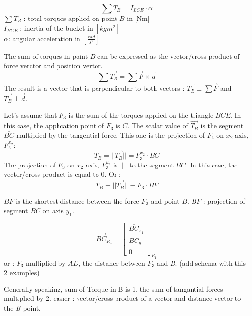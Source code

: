 \documentclass[12pt,a4paper]{article}
\begin{document}
	
		 
	\newpage
	\begin{equation}
		\sum T_B = I_{BCE} \cdot \alpha
	\end{equation}
	$\sum T_B$ : total torques applied on point $B$ in [Nm]\\
	$I_{BCE}$ : inertia of the bucket in $[kg m^2]$\\
	$\alpha$: angular acceleration in $[\frac{rad}{s^2}] $
	
	The sum of torques in point $B$ can be expressed as the vector/cross product of force verctor and position vertor. 
	\begin{equation}
		\sum \vec{T_B} = \sum \vec{F} \times \vec{d}
	\end{equation}
	The result is a vector that is perpendicular to both vectors : 
	$\vec{T_B} \perp \sum \vec{F}$ and 
	$\vec{T_B} \perp \vec{d}$.
	
	Let's assume that $F_3$ is the sum of the torques applied on the triangle $BCE$. In this case, the application point of $F_3$ is $C$. The scalar value of $\vec{T_B}$ is  the segment $\overline{BC}$ multiplied by the tangential force. This one is the projection of $F_3$ on $x_2$ axis, $F_3^{x_2}$:
	\begin{equation}
		T_B=||\vec{T_B}|| = F_3^{x_2} \cdot \overline{BC}
	\end{equation}
	The projection of $F_3$ on $x_2$ axis, $F_3^{y_2}$ is $\parallel$ to the segment $BC$. In this case, the vector/cross product is equal to $0$.
	Or : 
	\begin{equation}
		T_B=||\vec{T_B}|| = F_3 \cdot \overline{BF}
	\end{equation}
	
	$\overline{B F}$ is the shortest distance between the force $F_3$ and point $B$.
	$\overline{B F}$ : projection of segment $\overline{BC}$ on axis $y_1$. 
	
	\begin{equation}
		\vec{BC}_{R_{1}}=
		\begin{bmatrix}
			\overline{BC}_{x_1} \\
			\overline{BC}_{y_1}\\
			0
		\end{bmatrix}_{R_{1}} 
	\end{equation}
	or : $F_3$ multiplied by $AD$, the distance between $F_3$ and $B$. (add schema with this 2 examples)
	
	Generally speaking, sum of Torque in B is 
	1. the sum of tangantial forces multiplied by
	2. easier : vector/cross product of a vector and distance vector to the $B$ point.  
	
\end{document}
